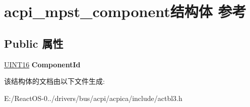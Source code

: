 \hypertarget{structacpi__mpst__component}{}\section{acpi\+\_\+mpst\+\_\+component结构体 参考}
\label{structacpi__mpst__component}
\subsection*{Public 属性}
\begin{DoxyCompactItemize}
\item 
\mbox{\label{structacpi__mpst__component_a5969d87d44891cb646b718c1deca285f}} 
\hyperlink{_processor_bind_8h_a09f1a1fb2293e33483cc8d44aefb1eb1}{U\+I\+N\+T16} {\bfseries Component\+Id}
\end{DoxyCompactItemize}


该结构体的文档由以下文件生成\+:\begin{DoxyCompactItemize}
\item 
E\+:/\+React\+O\+S-\/0../drivers/bus/acpi/acpica/include/actbl3.\+h\end{DoxyCompactItemize}

